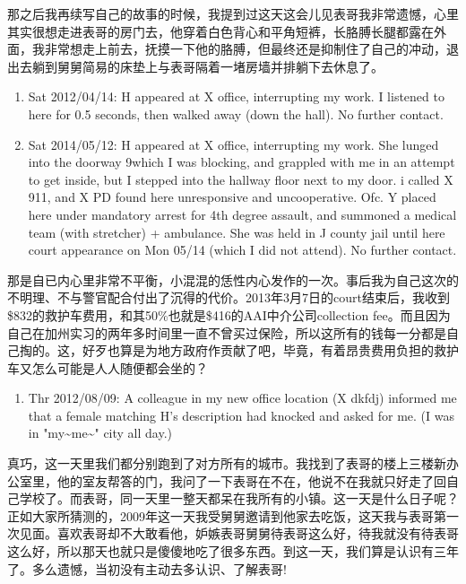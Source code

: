 \documentclass[12pt]{book}
\begin{document}
那之后我再续写自己的故事的时候，我提到过这天这会儿见表哥我非常遗憾，心里其实很想走进表哥的房门去，他穿着白色背心和平角短裤，长胳膊长腿都露在外面，我非常想走上前去，抚摸一下他的胳膊，但最终还是抑制住了自己的冲动，退出去躺到舅舅简易的床垫上与表哥隔着一堵房墙并排躺下去休息了。

\begin{enumerate}
\item Sat 2012/04/14: H appeared at X office, interrupting my work. I listened to here for 0.5 seconds, then walked away (down the hall). No further contact.

\item Sat 2014/05/12: H appeared at X office, interrupting my work. She lunged into the doorway 9which I was blocking, and grappled with me in an attempt to get inside, but I stepped into the hallway floor next to my door. i called X 911, and X PD found here unresponsive and uncooperative. Ofc. Y placed here under mandatory arrest for 4th degree assault, and summoned a medical team (with stretcher) + ambulance. She was held in J county jail until here court appearance on Mon 05/14 (which I did not attend). No further contact.
\end{enumerate}

那是自已内心里非常不平衡，小混混的恁性内心发作的一次。事后我为自己这次的不明理、不与警官配合付出了沉得的代价。2013年3月7日的court结束后，我收到\$832的救护车费用，和其50\%也就是\$416的AAI中介公司collection fee。而且因为自己在加州实习的两年多时间里一直不曾买过保险，所以这所有的钱每一分都是自己掏的。这，好歹也算是为地方政府作贡献了吧，毕竟，有着昂贵费用负担的救护车又怎么可能是人人随便都会坐的？

\begin{enumerate}
\item Thr 2012/08/09: A colleague in my new office location (X dkfdj) informed me that a female matching H's description had knocked and asked for me. (I was in "my\textasciitilde{}me\textasciitilde{}" city all day.)
\end{enumerate}

真巧，这一天里我们都分别跑到了对方所有的城市。我找到了表哥的楼上三楼新办公室里，他的室友帮答的门，我问了一下表哥在不在，他说不在我就只好走了回自己学校了。而表哥，同一天里一整天都呆在我所有的小镇。这一天是什么日子呢？正如大家所猜测的，2009年这一天我受舅舅邀请到他家去吃饭，这天我与表哥第一次见面。喜欢表哥却不大敢看他，妒嫉表哥舅舅待表哥这么好，待我就没有待表哥这么好，所以那天也就只是傻傻地吃了很多东西。到这一天，我们算是认识有三年了。多么遗憾，当初没有主动去多认识、了解表哥!
\end{document}

